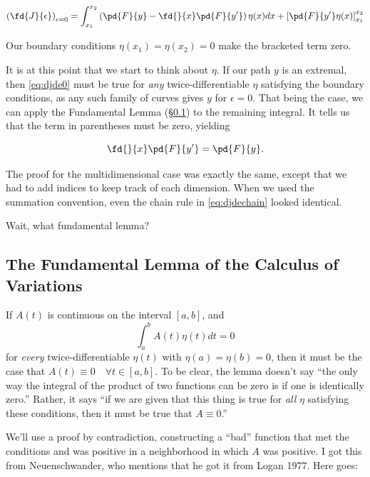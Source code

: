 \documentclass[12pt]{article}
\numberwithin{equation}{section}
\begin{document}
\begin{equation}
  \left( \fd{J}{\epsilon}\right)_{\epsilon=0} =  \int_{x_1}^{x_2} \left( \pd{F}{y} - \fd{}{x}\pd{F}{y'} \right)\eta(x)dx + 
  \left[ \pd{F}{y'}\eta(x)\right]_{x_1}^{x_2}
\end{equation}

Our boundary conditions $\eta(x_1) = \eta(x_2) = 0$ make the bracketed term zero.

It is at this point that we start to think about $\eta$. If our path
$y$ is an extremal, then \ref{eq:djde0} must be true for {\it any}
twice-differentiable $\eta$ satisfying the boundary conditions, as any
such family of curves gives $y$ for $\epsilon=0$. That being the case,
we can apply the Fundamental Lemma (\S\ref{sec:fundlemma}) to the remaining integral. It tells us
that the term in parentheses must be zero, yielding

\begin{equation}
  \label{eq:simple-el}
  \fd{}{x}\pd{F}{y'} = \pd{F}{y}.
\end{equation}

The proof for the multidimensional case was exactly the same, except that we had to add indices to keep track of each dimension. When we used the summation convention, even the chain rule in \ref{eq:djdechain} looked identical.


Wait, what fundamental lemma?

\subsection{The Fundamental Lemma of the Calculus of Variations}
\label{sec:fundlemma}


If $A(t)$ is continuous on the interval $[a,b]$, and
\begin{equation*}
  \int_a^b A(t)\eta(t)dt=0
\end{equation*}
for {\it every} twice-differentiable $\eta(t)$ with $\eta(a)=\eta(b)=0$,
then it must be the case that $A(t) \equiv 0 \quad \forall t \in [a,b]$. To
be clear, the lemma doesn't say ``the only way the integral of the
product of two functions can be zero is if one is identically zero.''
Rather, it says ``if we are given that this thing is true for
{\it all} $\eta$ satisfying these conditions, then it must be true that $A
\equiv 0$.''

We'll use a proof by contradiction, constructing a ``bad'' function that
met the conditions and was positive in a neighborhood in which $A$
was positive. I got this from Neuenschwander, who mentions that he got
it from Logan 1977. Here goes:
\end{document}
